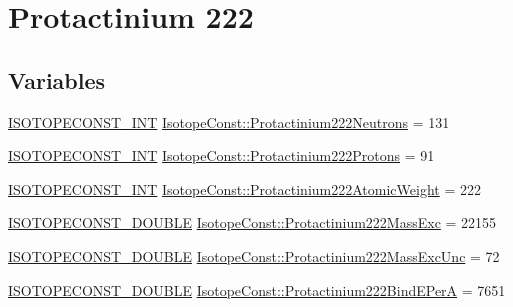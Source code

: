 \hypertarget{group___isotope_const-_protactinium-_pa222}{}\section{Protactinium 222}
\label{group___isotope_const-_protactinium-_pa222}
\subsection*{Variables}
\begin{DoxyCompactItemize}
\item 
\mbox{\hyperlink{group___isotope_const-_macros_ga5f18360b3e99483a35c32d789e62621c}{I\+S\+O\+T\+O\+P\+E\+C\+O\+N\+S\+T\+\_\+\+I\+NT}} \mbox{\hyperlink{group___isotope_const-_protactinium-_pa222_ga2a38111608c91cb65692adf04897b6be}{Isotope\+Const\+::\+Protactinium222\+Neutrons}} = 131
\item 
\mbox{\hyperlink{group___isotope_const-_macros_ga5f18360b3e99483a35c32d789e62621c}{I\+S\+O\+T\+O\+P\+E\+C\+O\+N\+S\+T\+\_\+\+I\+NT}} \mbox{\hyperlink{group___isotope_const-_protactinium-_pa222_ga8bd67a60986928870e3900baca7c1af3}{Isotope\+Const\+::\+Protactinium222\+Protons}} = 91
\item 
\mbox{\hyperlink{group___isotope_const-_macros_ga5f18360b3e99483a35c32d789e62621c}{I\+S\+O\+T\+O\+P\+E\+C\+O\+N\+S\+T\+\_\+\+I\+NT}} \mbox{\hyperlink{group___isotope_const-_protactinium-_pa222_gaeabea049a6bc5626afa02e64023cd1f5}{Isotope\+Const\+::\+Protactinium222\+Atomic\+Weight}} = 222
\item 
\mbox{\hyperlink{group___isotope_const-_macros_ga8f45a7272ce02c0b4c65c44636ed719a}{I\+S\+O\+T\+O\+P\+E\+C\+O\+N\+S\+T\+\_\+\+D\+O\+U\+B\+LE}} \mbox{\hyperlink{group___isotope_const-_protactinium-_pa222_gaeb55742a6e6b55b046f854dc1d4ef78d}{Isotope\+Const\+::\+Protactinium222\+Mass\+Exc}} = 22155
\item 
\mbox{\hyperlink{group___isotope_const-_macros_ga8f45a7272ce02c0b4c65c44636ed719a}{I\+S\+O\+T\+O\+P\+E\+C\+O\+N\+S\+T\+\_\+\+D\+O\+U\+B\+LE}} \mbox{\hyperlink{group___isotope_const-_protactinium-_pa222_gabf15afdb47d7844386bc16404d05e50d}{Isotope\+Const\+::\+Protactinium222\+Mass\+Exc\+Unc}} = 72
\item 
\mbox{\hyperlink{group___isotope_const-_macros_ga8f45a7272ce02c0b4c65c44636ed719a}{I\+S\+O\+T\+O\+P\+E\+C\+O\+N\+S\+T\+\_\+\+D\+O\+U\+B\+LE}} \mbox{\hyperlink{group___isotope_const-_protactinium-_pa222_ga4fcd000f23511561549e0235e6d77aa2}{Isotope\+Const\+::\+Protactinium222\+Bind\+E\+PerA}} = 7651

\end{DoxyCompactItemize}
